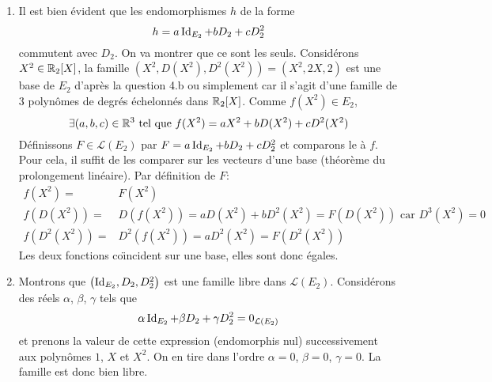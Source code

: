 \begin{enumerate}
\begin{enumerate}
  \item Il est bien {\'e}vident que les endomorphismes $h$ de la forme
\begin{displaymath}
  h = a \operatorname{Id}_{E_2} + bD_2 + c D_2^2
\end{displaymath}
commutent avec $D_2$. On va montrer que ce sont les seuls.\newline
Considérons $X^2\in \mathbb{R}_2[X]$, la famille $(X^2,D(X^2),D^2(X^2)) = (X^2,2X,2)$ est une base de $E_2$ d'après la question 4.b ou simplement car il s'agit d'une famille de 3 polynômes de degrés échelonnés dans $\mathbb{R}_2[X]$. Comme $f(X^2)\in E_2$, 
\begin{displaymath}
  \exists (a,b,c)\in \mathbb{R}^3 \text{ tel que } f(X^2) = aX^2 + bD(X^2) + cD^2(X^2)
\end{displaymath}
Définissons $F\in \mathcal{L}(E_2)$ par $F =a \operatorname{Id}_{E_2} + bD_2 + cD_2^2$ et comparons le à $f$. Pour cela, il suffit de les comparer sur les vecteurs d'une base (théorème du prolongement linéaire).\newline
Par d{\'e}finition de $F$:
\begin{align*}
 f(X^2)=& F(X^2) \\
f(D(X^2))=& D(f(X^2))=aD(X^2)+bD^2(X^2)=F(D(X^2)) \text{ car } D^3(X^2)=0 \\
f(D^2(X^2))=& D^2(f(X^2))=aD^2(X^2)=F(D^2(X^2))
\end{align*}
Les deux fonctions co{\"\i}ncident sur une base, elles sont donc {\'e}gales.

  \item Montrons que $\left( \operatorname{Id}_{E_2}, D_2, D_2^2\right)$ est une famille libre dans $\mathcal{L}(E_2)$. Considérons des réels $\alpha$, $\beta$, $\gamma$ tels que
\begin{displaymath}
  \alpha \operatorname{Id}_{E_2} + \beta D_2 + \gamma D_2^2 = 0_{\mathcal{L}(E_2)}
\end{displaymath}
et prenons la valeur de cette expression (endomorphis nul) successivement aux polynômes $1$, $X$ et $X^2$. On en tire dans l'ordre $\alpha = 0$, $\beta=0$, $\gamma =0$. La famille est donc bien libre.


\end{enumerate}
\end{enumerate}

